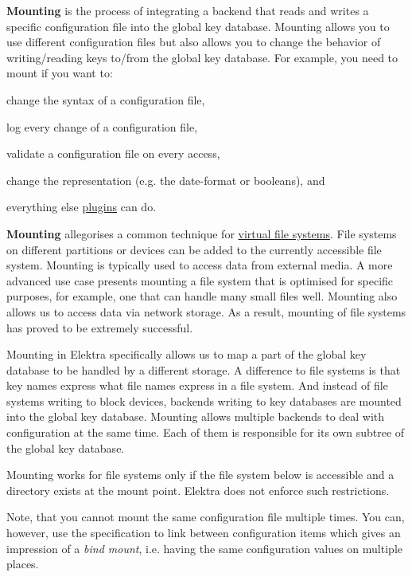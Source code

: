 {\bfseries Mounting} is the process of integrating a backend that reads and writes a specific configuration file into the global key database. Mounting allows you to use different configuration files but also allows you to change the behavior of writing/reading keys to/from the global key database. For example, you need to mount if you want to\+:


\begin{DoxyItemize}
\item change the syntax of a configuration file,
\item log every change of a configuration file,
\item validate a configuration file on every access,
\item change the representation (e.\+g. the date-\/format or booleans), and
\item everything else \hyperlink{src_plugins_README_md}{plugins} can do.
\end{DoxyItemize}

{\bfseries Mounting} allegorises a common technique for \hyperlink{doc_BIGPICTURE_md}{virtual file systems}. File systems on different partitions or devices can be added to the currently accessible file system. Mounting is typically used to access data from external media. A more advanced use case presents mounting a file system that is optimised for specific purposes, for example, one that can handle many small files well. Mounting also allows us to access data via network storage. As a result, mounting of file systems has proved to be extremely successful.

Mounting in Elektra specifically allows us to map a part of the global key database to be handled by a different storage. A difference to file systems is that key names express what file names express in a file system. And instead of file systems writing to block devices, backends writing to key databases are mounted into the global key database. Mounting allows multiple backends to deal with configuration at the same time. Each of them is responsible for its own subtree of the global key database.

Mounting works for file systems only if the file system below is accessible and a directory exists at the mount point. Elektra does not enforce such restrictions.

Note, that you cannot mount the same configuration file multiple times. You can, however, use the specification to link between configuration items which gives an impression of a {\itshape bind mount}, i.\+e. having the same configuration values on multiple places.

